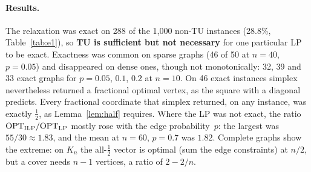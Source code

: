 \paragraph{Results.} The relaxation was exact on 288 of the 1,000 non-TU instances (28.8\%, Table~\ref{tab:e1}), so \textbf{TU is sufficient but not necessary} for one particular LP to be exact. Exactness was common on sparse graphs (46 of 50 at $n=40$, $p=0.05$) and disappeared on dense ones, though not monotonically: 32, 39 and 33 exact graphs for $p=0.05$, $0.1$, $0.2$ at $n=10$. On 46 exact instances simplex nevertheless returned a fractional optimal vertex, as the square with a diagonal predicts. Every fractional coordinate that simplex returned, on any instance, was exactly $\tfrac12$, as Lemma~\ref{lem:half} requires. Where the LP was not exact, the ratio $\mathrm{OPT}_{\mathrm{ILP}}/\mathrm{OPT}_{\mathrm{LP}}$ mostly rose with the edge probability~$p$: the largest was $55/30 \approx 1.83$, and the mean at $n=60$, $p=0.7$ was $1.82$. Complete graphs show the extreme: on $K_n$ the all-$\tfrac12$ vector is optimal (sum the edge constraints) at $n/2$, but a cover needs $n-1$ vertices, a ratio of $2-2/n$.